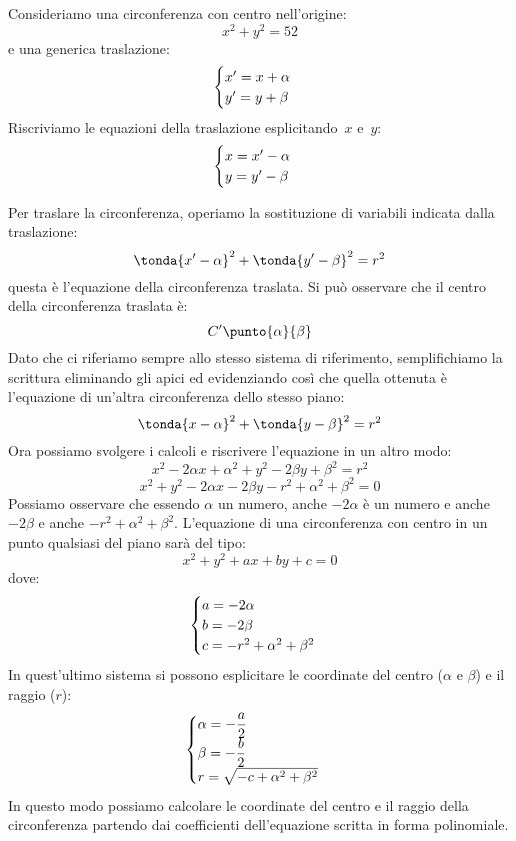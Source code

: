 Consideriamo una circonferenza con centro nell'origine:
\[x^2 + y^2 = 52\]
e una generica traslazione:
\[\begin{cases}x' = x + \alpha \\ y' = y + \beta\end{cases}\]
Riscriviamo le equazioni della traslazione esplicitando~\(x\) e~\(y\):
\[\begin{cases}x = x'- \alpha \\ y = y' - \beta\end{cases}\]

Per traslare la circonferenza, operiamo la sostituzione di variabili
indicata dalla traslazione:
\[\tonda{x'-\alpha}^2 + \tonda{y'-\beta}^2 = r^2\]
questa è l'equazione della circonferenza traslata. Si può osservare che il 
centro della circonferenza traslata è: 
\[C'\punto{\alpha}{\beta}\]
Dato che ci riferiamo sempre allo stesso sistema di riferimento, semplifichiamo 
la scrittura eliminando gli apici ed evidenziando così che quella ottenuta è 
l'equazione di un'altra circonferenza dello stesso piano:
\[\tonda{x-\alpha}^2 + \tonda{y-\beta}^2 = r^2\]
Ora possiamo svolgere i calcoli e riscrivere l'equazione in un altro modo:
\[x^2 -2 \alpha x + \alpha^2 + y^2 -2 \beta y + \beta^2 = r^2\]
\[x^2 + y^2 -2 \alpha x -2 \beta y - r^2 + \alpha^2 + \beta^2 = 0\]
Possiamo osservare che essendo \(\alpha\) un numero, anche \(-2\alpha\) è un 
numero e anche \(-2\beta\) e anche \(- r^2 + \alpha^2 + \beta^2\). 
L'equazione di una circonferenza con centro in un punto qualsiasi del piano 
sarà del tipo:
\[x^2 + y^2 +a x +b y +c = 0\]
dove:
\[\begin{cases}a = -2\alpha \\ b = -2\beta \\ c = -r^2 +\alpha^2 +\beta^2\end{cases}\]
In quest'ultimo sistema si possono esplicitare le coordinate del 
centro (\(\alpha\) e \(\beta\)) e il raggio (\(r\)):
\[\begin{cases}\alpha = -\dfrac{a}{2} \\ 
           \beta = -\dfrac{b}{2} \\ 
           r = \sqrt{-c +\alpha^2 + \beta^2}\end{cases}\]
In questo modo possiamo calcolare le coordinate del centro e il raggio della 
circonferenza partendo dai coefficienti dell'equazione scritta in forma 
polinomiale.



